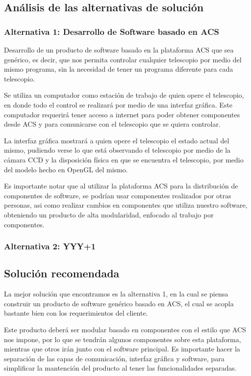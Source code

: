 \documentclass[letterpaper,spanish,10pt]{article}
\begin{document}
\subsection{An\'alisis de las alternativas de soluci\'on}
\subsubsection{Alternativa 1: Desarrollo de Software basado en ACS} %
Desarrollo de un producto de software basado en la plataforma ACS que sea gen\'erico,
es decir, que nos permita controlar cualquier telescopio por medio del mismo
programa, sin la necesidad de tener un programa diferente para cada telescopio.

Se utiliza un computador como estaci\'on de trabajo de quien opere el telescopio, 
en donde todo el control se realizar\'a por medio de una interfaz gr\'afica. Este
computador requerir\'a tener acceso a internet para poder obtener componentes desde
ACS y para comunicarse con el telescopio que se quiera controlar.

La interfaz gr\'afica mostrar\'a a quien opere el telescopio el estado actual del
mismo, pudiendo verse lo que est\'a observando el telescopio por medio de la
c\'amara CCD y la disposici\'on f\'isica en que se encuentra el telescopio, por medio
del modelo hecho en OpenGL del mismo.

Es importante notar que al utilizar la plataforma ACS para la distribuci\'on de 
componentes de software, se podr\'ian usar componentes realizados por otras personas, 
asi como realizar cambios en componentes que utiliza nuestro software, obteniendo un
producto de alta modularidad, enfocado al trabajo por componentes.

\subsubsection{Alternativa 2: YYY+1} %



\subsection{Soluci\'on recomendada} %
La mejor soluci\'on que encontramos es la alternativa 1, en la cual se piensa construir
un producto de software gen\'erico basado en ACS, el cual se acopla bastante bien 
con los requerimientos del cliente.

Este producto deber\'a ser modular basado en componentes con el estilo que ACS nos
impone, por lo que se tendr\'an algunos componentes sobre esta plataforma, mientras que
otros ir\'an junto con el software principal. Es importante hacer la separaci\'on
de las capas de comunicaci\'on, interfaz gr\'afica y software, para simplificar la
mantenci\'on del producto al tener las funcionalidades separadas.
\end{document}
